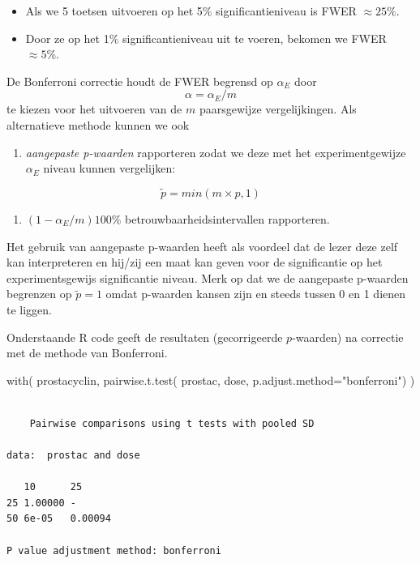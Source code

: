 \documentclass[
  dutch,
  letterpaper,
  12pt]{book}
\newenvironment{Shaded}{\begin{snugshade}}{\end{snugshade}}
\newcommand{\AttributeTok}[1]{\textcolor[rgb]{0.40,0.45,0.13}{#1}}
\newcommand{\FunctionTok}[1]{\textcolor[rgb]{0.28,0.35,0.67}{#1}}
\newcommand{\NormalTok}[1]{\textcolor[rgb]{0.00,0.23,0.31}{#1}}
\newcommand{\StringTok}[1]{\textcolor[rgb]{0.13,0.47,0.30}{#1}}
\providecommand{\tightlist}{%
  \setlength{\itemsep}{0pt}\setlength{\parskip}{0pt}}
\theoremstyle{definition}
\theoremstyle{definition}
\theoremstyle{definition}
\theoremstyle{remark}
\begin{document}
\begin{itemize}
\tightlist
\item
  Als we 5 toetsen uitvoeren op het 5\% significantieniveau is FWER
  \(\approx 25\%\).
\item
  Door ze op het 1\% significantieniveau uit te voeren, bekomen we FWER
  \(\approx 5\%\).
\end{itemize}

De Bonferroni correctie houdt de FWER begrensd op \(\alpha_E\) door
\[\alpha=\alpha_E/m\] te kiezen voor het uitvoeren van de \(m\)
paarsgewijze vergelijkingen. Als alternatieve methode kunnen we ook

\begin{enumerate}
\def\labelenumi{\arabic{enumi}.}
\tightlist
\item
  \emph{aangepaste p-waarden} rapporteren zodat we deze met het
  experimentgewijze \(\alpha_E\) niveau kunnen vergelijken:
\end{enumerate}

\[\tilde{p}=min(m\times p,1)\]

\begin{enumerate}
\def\labelenumi{\arabic{enumi}.}
\setcounter{enumi}{1}
\tightlist
\item
  \((1-\alpha_E/m)100\%\) betrouwbaarheidsintervallen rapporteren.
\end{enumerate}

Het gebruik van aangepaste p-waarden heeft als voordeel dat de lezer
deze zelf kan interpreteren en hij/zij een maat kan geven voor de
significantie op het experimentsgewijs significantie niveau. Merk op dat
we de aangepaste p-waarden begrenzen op \(\tilde{p}=1\) omdat p-waarden
kansen zijn en steeds tussen 0 en 1 dienen te liggen.

Onderstaande R code geeft de resultaten (gecorrigeerde \(p\)-waarden) na
correctie met de methode van Bonferroni.

\begin{Shaded}
\begin{Highlighting}[]
\FunctionTok{with}\NormalTok{(}
\NormalTok{  prostacyclin,}
  \FunctionTok{pairwise.t.test}\NormalTok{(}
\NormalTok{    prostac,}
\NormalTok{    dose,}
    \AttributeTok{p.adjust.method=}\StringTok{"bonferroni"}\NormalTok{)}
\NormalTok{  )}
\end{Highlighting}
\end{Shaded}

\begin{verbatim}

    Pairwise comparisons using t tests with pooled SD 

data:  prostac and dose 

   10      25     
25 1.00000 -      
50 6e-05   0.00094

P value adjustment method: bonferroni 
\end{verbatim}
\end{document}
